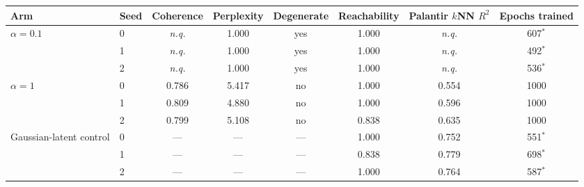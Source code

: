 \begin{tabular}{llcccccc}
\toprule
Arm & Seed & Coherence & Perplexity & Degenerate & Reachability & Palantir $k$NN $R^2$ & Epochs trained \\
\midrule
\multirow{3}{*}{$\alpha=0.1$} & 0 & \textit{n.q.} & 1.000 & yes & 1.000 & \textit{n.q.} & 607$^{\ast}$ \\
 & 1 & \textit{n.q.} & 1.000 & yes & 1.000 & \textit{n.q.} & 492$^{\ast}$ \\
 & 2 & \textit{n.q.} & 1.000 & yes & 1.000 & \textit{n.q.} & 536$^{\ast}$ \\
\midrule
\multirow{3}{*}{$\alpha=1$} & 0 & 0.786 & 5.417 & no & 1.000 & 0.554 & 1000 \\
 & 1 & 0.809 & 4.880 & no & 1.000 & 0.596 & 1000 \\
 & 2 & 0.799 & 5.108 & no & 0.838 & 0.635 & 1000 \\
\midrule
\multirow{3}{*}{Gaussian-latent control} & 0 & --- & --- & --- & 1.000 & 0.752 & 551$^{\ast}$ \\
 & 1 & --- & --- & --- & 0.838 & 0.779 & 698$^{\ast}$ \\
 & 2 & --- & --- & --- & 1.000 & 0.764 & 587$^{\ast}$ \\
\bottomrule
\end{tabular}
